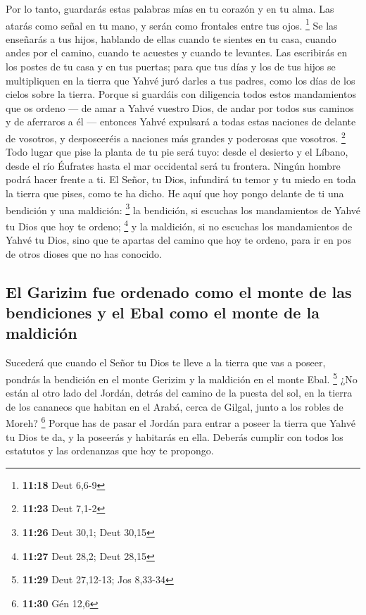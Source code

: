 \begin{paracol}{2}
 Por lo tanto, guardarás estas palabras mías en tu
corazón y en tu alma. Las atarás como señal en tu mano, y serán como
frontales entre tus ojos. \footnote{\textbf{11:18} Deut 6,6-9}
 Se las enseñarás a tus hijos, hablando de ellas cuando
te sientes en tu casa, cuando andes por el camino, cuando te acuestes y
cuando te levantes.  Las escribirás en los postes de tu
casa y en tus puertas;  para que tus días y los de tus
hijos se multipliquen en la tierra que Yahvé juró darles a tus padres,
como los días de los cielos sobre la tierra.  Porque si
guardáis con diligencia todos estos mandamientos que os ordeno --- de
amar a Yahvé vuestro Dios, de andar por todos sus caminos y de aferraros
a él ---  entonces Yahvé expulsará a todas estas naciones
de delante de vosotros, y desposeeréis a naciones más grandes y
poderosas que vosotros. \footnote{\textbf{11:23} Deut 7,1-2}
 Todo lugar que pise la planta de tu pie será tuyo: desde
el desierto y el Líbano, desde el río Éufrates hasta el mar occidental
será tu frontera.  Ningún hombre podrá hacer frente a ti.
El Señor, tu Dios, infundirá tu temor y tu miedo en toda la tierra que
pises, como te ha dicho.  He aquí que hoy pongo delante
de ti una bendición y una maldición: \footnote{\textbf{11:26} Deut 30,1;
  Deut 30,15}  la bendición, si escuchas los mandamientos
de Yahvé tu Dios que hoy te ordeno; \footnote{\textbf{11:27} Deut 28,2;
  Deut 28,15}  y la maldición, si no escuchas los
mandamientos de Yahvé tu Dios, sino que te apartas del camino que hoy te
ordeno, para ir en pos de otros dioses que no has conocido.

\hypertarget{el-garizim-fue-ordenado-como-el-monte-de-las-bendiciones-y-el-ebal-como-el-monte-de-la-maldiciuxf3n}{%
\subsection{El Garizim fue ordenado como el monte de las bendiciones y
el Ebal como el monte de la
maldición}\label{el-garizim-fue-ordenado-como-el-monte-de-las-bendiciones-y-el-ebal-como-el-monte-de-la-maldiciuxf3n}}

 Sucederá que cuando el Señor tu Dios te lleve a la
tierra que vas a poseer, pondrás la bendición en el monte Gerizim y la
maldición en el monte Ebal. \footnote{\textbf{11:29} Deut 27,12-13; Jos
  8,33-34}  ¿No están al otro lado del Jordán, detrás del
camino de la puesta del sol, en la tierra de los cananeos que habitan en
el Arabá, cerca de Gilgal, junto a los robles de Moreh? \footnote{\textbf{11:30}
  Gén 12,6}  Porque has de pasar el Jordán para entrar a
poseer la tierra que Yahvé tu Dios te da, y la poseerás y habitarás en
ella.  Deberás cumplir con todos los estatutos y las
ordenanzas que hoy te propongo.


\end{paracol}
